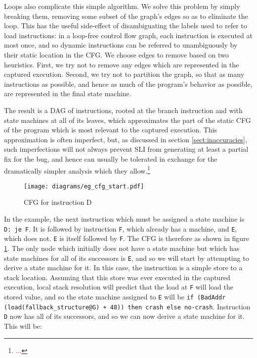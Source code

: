 \documentclass[10pt,twocolumn,preprint,natbib,authoryear]{sigplanconf}
\newcommand{\editorial}[1]{\textcolor{red}{\footnote{\textcolor{red}{#1}}}}
\begin{document}
Loops also complicate this simple algorithm.  We solve this problem by
simply breaking them, removing some subset of the graph's edges so as
to eliminate the loop.  This has the useful side-effect of
disambiguating the labels used to refer to load instructions: in a
loop-free control flow graph, each instruction is executed at most
once, and so dynamic instructions can be referred to unambiguously by
their static location in the CFG.  We choose edges to remove based on
two heuristics.  First, we try not to remove any edges which are
represented in the captured execution.  Second, we try not to
partition the graph, so that as many instructions as possible, and
hence as much of the program's behavior as possible, are represented
in the final state machine.

The result is a DAG of instructions, rooted at the branch instruction
and with state machines at all of its leaves, which approximates the
part of the static CFG of the program which is most relevant to the
captured execution.  This approximation is often imperfect, but, as
discussed in section \ref{sect:inaccuracies}, such imperfections will
not always prevent SLI from generating at least a partial fix for the
bug, and hence can usually be tolerated in exchange for the
dramatically simpler analysis which they allow.\editorial{...}

\begin{figure}
\texttt{[image: diagrams/eg\_cfg\_start.pdf]}
\caption{CFG for instruction D}
\label{fig:eg_cfg}
\end{figure}

In the example, the next instruction which must be assigned a state
machine is \verb|D: je F|.  It is followed by instruction \verb|F|,
which already has a machine, and \verb|E|, which does not.  \verb|E|
is itself followed by \verb|F|.  The CFG is therefore as shown in
figure \ref{fig:eg_cfg}.  The only node which initially does not have
a state machine but which has state machines for all of its successors
is \verb|E|, and so we will start by attempting to derive a state
machine for it.  In this case, the instruction is a simple store to a
stack location.  Assuming that this store was ever executed in the
captured execution, local stack resolution will predict that the load
at \verb|F| will load the stored value, and so the state machine
assigned to \verb|E| will be
\verb|if (BadAddr (load(fallback_structure@G) + 48)) then crash else no-crash|.
Instruction \verb|D| now has all of its successors, and so we can
now derive a state machine for it.  This will be:
\end{document}
